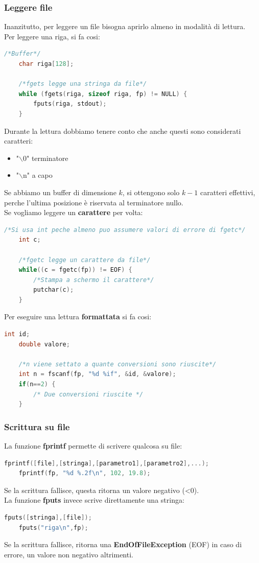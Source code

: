 \documentclass[12pt,a4paper]{article}
\begin{document}
\subsubsection{Leggere file}
Inanzitutto, per leggere un file bisogna aprirlo almeno in modalità di lettura.\\
Per leggere una riga, si fa cosi:
\begin{lstlisting}[language=C]
    /*Buffer*/
    char riga[128];

    /*fgets legge una stringa da file*/
    while (fgets(riga, sizeof riga, fp) != NULL) {
        fputs(riga, stdout);
    }
\end{lstlisting}
Durante la lettura dobbiamo tenere conto che anche questi sono considerati caratteri:
\begin{itemize}
    \item "$\backslash$0" terminatore
    \item "$\backslash$n" a capo
\end{itemize}
Se abbiamo un buffer di dimensione $k$, si ottengono solo $k-1$ caratteri effettivi, perche l'ultima posizione è riservata al terminatore nullo.\\
Se vogliamo leggere un \textbf{carattere} per volta:
\begin{lstlisting}[language=C]
    /*Si usa int peche almeno puo assumere valori di errore di fgetc*/
    int c;

    /*fgetc legge un carattere da file*/
    while((c = fgetc(fp)) != EOF) {
        /*Stampa a schermo il carattere*/
        putchar(c);
    }
\end{lstlisting} 
Per eseguire una lettura \textbf{formattata} si fa cosi:
\begin{lstlisting}[language=C]
    int id;
    double valore;

    /*n viene settato a quante conversioni sono riuscite*/
    int n = fscanf(fp, "%d %if", &id, &valore);
    if(n==2) {
        /* Due conversioni riuscite */
    }
\end{lstlisting}
\subsubsection{Scrittura su file}
La funzione \textbf{fprintf} permette di scrivere qualcosa su file:
\begin{lstlisting}[language=C]
    fprintf([file],[stringa],[parametro1],[parametro2],...);
    fprintf(fp, "%d %.2f\n", 102, 19.8);
\end{lstlisting}
Se la scrittura fallisce, questa ritorna un valore negativo (<0).\\
La funzione \textbf{fputs} invece scrive direttamente una stringa:
\begin{lstlisting}[language=C]
    fputs([stringa],[file]);
    fputs("riga\n",fp);
\end{lstlisting} 
Se la scrittura fallisce, ritorna una \textbf{EndOfFileException} (EOF) in caso di errore, un valore non negativo altrimenti.
\end{document}

